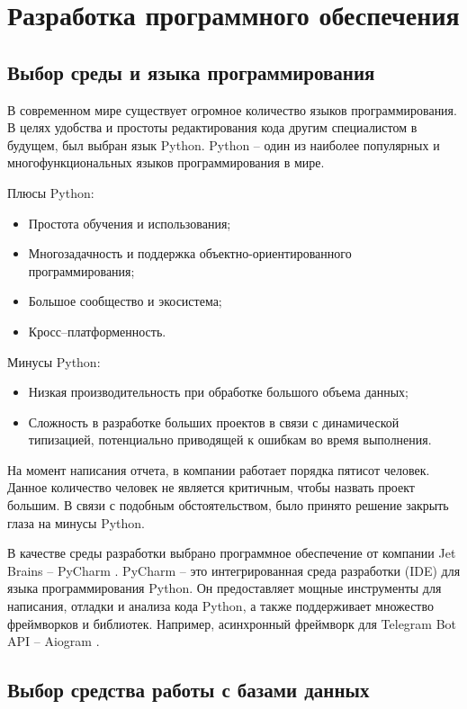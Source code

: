 \section{Разработка программного обеспечения}

\subsection{Выбор среды и языка программирования}
 
В современном мире существует огромное количество языков программирования. В целях удобства и простоты редактирования кода другим специалистом в будущем, был выбран язык Python. Python -- один из наиболее популярных и многофункциональных языков программирования в мире. 

Плюсы Python:
\begin{itemize}
\item Простота обучения и использования;
\item Многозадачность и поддержка объектно-ориентированного программирования;
\item Большое сообщество и экосистема;
\item Кросс--платформенность.
\end{itemize}

Минусы Python:
\begin{itemize}
\item Низкая производительность при обработке большого объема данных;
\item Сложность в разработке больших проектов в связи с динамической типизацией, потенциально приводящей к ошибкам во время выполнения.
\end{itemize}

На момент написания отчета, в компании работает порядка пятисот человек. Данное количество человек не является критичным, чтобы назвать проект большим. В связи с подобным обстоятельством, было принято решение закрыть глаза на минусы Python.

В качестве среды разработки выбрано программное обеспечение от компании Jet Brains -- PyCharm \cite{pycharm}. PyCharm -- это интегрированная среда разработки (IDE) для языка программирования Python. Он предоставляет мощные инструменты для написания, отладки и анализа кода Python, а также поддерживает множество фреймворков и библиотек. Например, асинхронный фреймворк для Telegram Bot API -- Aiogram \cite{aiogram}.

\subsection{Выбор средства работы с базами данных}

